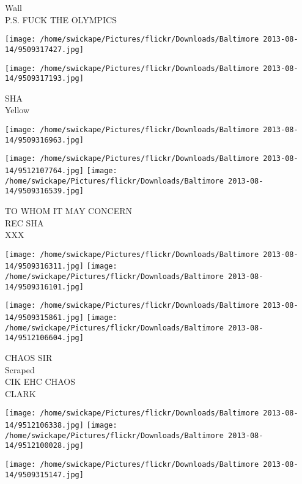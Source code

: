\documentclass[10pt,letterpaper]{article}
\begin{document}
Wall\\
P.S. FUCK THE OLYMPICS\\
\pagebreak

\texttt{[image: /home/swickape/Pictures/flickr/Downloads/Baltimore 2013-08-14/9509317427.jpg]}

\vspace{0.25in}
\texttt{[image: /home/swickape/Pictures/flickr/Downloads/Baltimore 2013-08-14/9509317193.jpg]}

SHA\\
Yellow\\
\pagebreak

\texttt{[image: /home/swickape/Pictures/flickr/Downloads/Baltimore 2013-08-14/9509316963.jpg]}

\vspace{0.25in}
\texttt{[image: /home/swickape/Pictures/flickr/Downloads/Baltimore 2013-08-14/9512107764.jpg]}
\texttt{[image: /home/swickape/Pictures/flickr/Downloads/Baltimore 2013-08-14/9509316539.jpg]}

TO WHOM IT MAY CONCERN\\
REC SHA\\
XXX\\
\pagebreak

\texttt{[image: /home/swickape/Pictures/flickr/Downloads/Baltimore 2013-08-14/9509316311.jpg]}
\texttt{[image: /home/swickape/Pictures/flickr/Downloads/Baltimore 2013-08-14/9509316101.jpg]}

\texttt{[image: /home/swickape/Pictures/flickr/Downloads/Baltimore 2013-08-14/9509315861.jpg]}
\texttt{[image: /home/swickape/Pictures/flickr/Downloads/Baltimore 2013-08-14/9512106604.jpg]}

CHAOS SIR\\
Scraped\\
CIK EHC CHAOS\\
CLARK\\
\pagebreak

\texttt{[image: /home/swickape/Pictures/flickr/Downloads/Baltimore 2013-08-14/9512106338.jpg]}
\texttt{[image: /home/swickape/Pictures/flickr/Downloads/Baltimore 2013-08-14/9512100028.jpg]}

\vspace{0.25in}
\texttt{[image: /home/swickape/Pictures/flickr/Downloads/Baltimore 2013-08-14/9509315147.jpg]}
\end{document}
